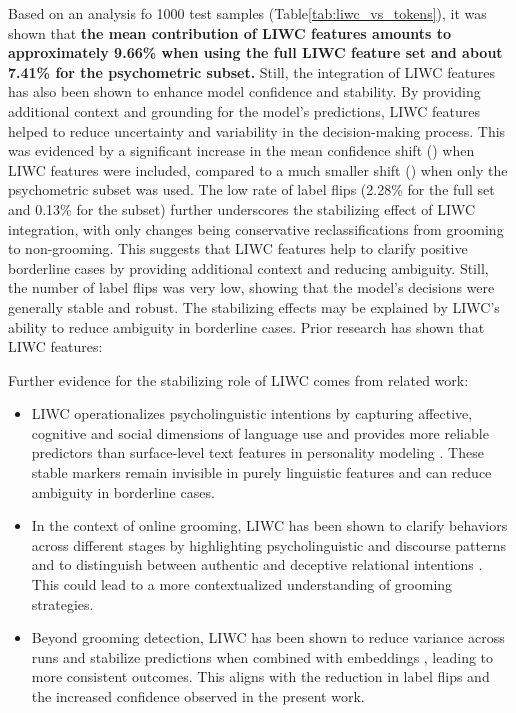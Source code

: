 Based on an analysis fo 1000 test samples (Table\ref{tab:liwc_vs_tokens}), it was shown that \textbf{the mean contribution of LIWC features amounts to approximately 9.66\% when using the full LIWC feature set and about 7.41\% for the psychometric subset.} Still, the integration of LIWC features has also been shown to enhance model confidence and stability. By providing additional context and grounding for the model's predictions, LIWC features helped to reduce uncertainty and variability in the decision-making process. This was evidenced by a significant increase in the mean confidence shift (\Delta \mu {}) when LIWC features were included, compared to a much smaller shift (\Delta \mu {}) when only the psychometric subset was used. The low rate of label flips (2.28\% for the full set and 0.13\% for the subset) further underscores the stabilizing effect of LIWC integration, with only changes being conservative reclassifications from grooming to non-grooming. This suggests that LIWC features help to clarify positive borderline cases by providing additional context and reducing ambiguity. Still, the number of label flips was very low, showing that the model's decisions were generally stable and robust. The stabilizing effects may be explained by LIWC’s ability to reduce ambiguity in borderline cases. Prior research has shown that LIWC features:

Further evidence for the stabilizing role of LIWC comes from related work:

\begin{itemize}
    \item LIWC operationalizes psycholinguistic intentions by capturing affective, cognitive and social dimensions of language use \cite{pennebaker2022liwc} and provides more reliable predictors than surface-level text features in personality modeling \cite{farnadi2018user}. These stable markers remain invisible in purely linguistic features and can reduce ambiguity in borderline cases.
    \item In the context of online grooming, LIWC has been shown to clarify behaviors across different stages by highlighting psycholinguistic and discourse patterns \cite{Cano2014} and to distinguish between authentic and deceptive relational intentions \cite{broome2020psycholinguistic}. This could lead to a more contextualized understanding of grooming strategies.
    \item Beyond grooming detection, LIWC has been shown to reduce variance across runs and stabilize predictions when combined with embeddings \cite{mehta2020bottomup}, leading to more consistent outcomes. This aligns with the reduction in label flips and the increased confidence observed in the present work.
\end{itemize}

